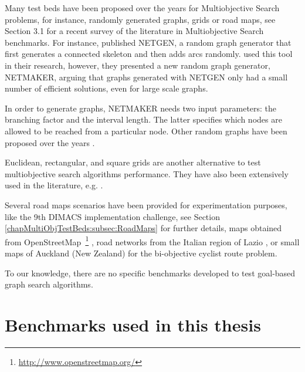 Many test beds have been proposed over the years for Multiobjective Search problems, for instance, randomly generated graphs, grids or road maps, see Section 3.1 \citep{Machuca2012a} for a recent survey of the literature in Multiobjective Search benchmarks. For instance, \citet{klingmanetal1974} published NETGEN, a random graph generator that first generates a connected skeleton and then adds arcs randomly. \citet{skriverandersen2000} used this tool in their research, however, they presented a new random graph generator, NETMAKER, arguing that graphs generated with NETGEN only had a small number of efficient solutions, even for large scale graphs. 

In order to generate graphs, NETMAKER needs two input parameters: the branching factor and the interval length. The latter specifies which nodes are allowed to be reached from a particular node. Other random graphs have been proposed over the years \citep{hansen1979,JoaoCarlosNamoradoClimaco1982,nanceetal1987,Brumbaugh-Smith1989, Mote1991, gandibleuxetal2006,martinsetal2007,Iori2010,caramiaetal2010,Galand2010}.

Euclidean, rectangular, and square grids are another alternative to test multiobjective search algorithms performance. They have also been extensively used in the literature, e.g.  \citep{Mote1991,guerrieromusmanno2001,guerrieroetal2001,martinsetal2007,caramiaetal2010}.

Several road maps scenarios have been provided for experimentation purposes, like the 9th DIMACS implementation challenge, see Section \ref{chapMultiObjTestBeds:subsec:RoadMaps} for further details, maps obtained from OpenStreetMap~\footnote{\url{http://www.openstreetmap.org/}} \citep{Raith2009a,Raith2009}, road networks from the Italian region of Lazio \citep{caramiaetal2010}, or small maps of Auckland (New Zealand) \citep{Raith2009} for the bi-objective cyclist route problem. 

To our knowledge, there are no specific benchmarks developed to test goal-based graph search algorithms.

\section{Benchmarks used in this thesis}
\label{chapMultiObjTestBeds:sec:Benchmarks}

